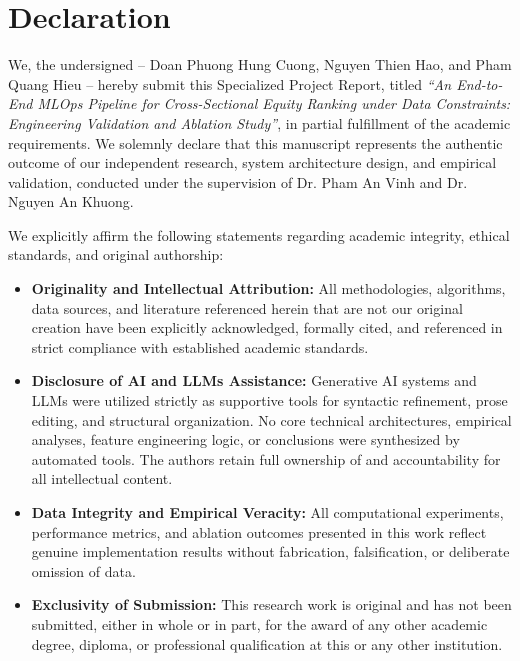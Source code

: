 \part*{Declaration}
We, the undersigned -- Doan Phuong Hung Cuong, Nguyen Thien Hao, and Pham Quang Hieu -- hereby submit this Specialized Project Report, titled \textit{``An End-to-End \acs{MLOps} Pipeline for Cross-Sectional Equity Ranking under Data Constraints: Engineering Validation and Ablation Study''}, in partial fulfillment of the academic requirements. We solemnly declare that this manuscript represents the authentic outcome of our independent research, system architecture design, and empirical validation, conducted under the supervision of {\color{red}Dr. Pham An Vinh} and {\color{red}Dr. Nguyen An Khuong}.

\medskip

We explicitly affirm the following statements regarding academic integrity, ethical standards, and original authorship:
\begin{itemize}
    \item \textbf{Originality and Intellectual Attribution:} All methodologies, algorithms, data sources, and literature referenced herein that are not our original creation have been explicitly acknowledged, formally cited, and referenced in strict compliance with established academic standards.
    \item \textbf{Disclosure of \acs{AI} and \acs{LLMs} Assistance:} Generative \ac{AI} systems and \ac{LLMs} were utilized strictly as supportive tools for syntactic refinement, prose editing, and structural organization. No core technical architectures, empirical analyses, feature engineering logic, or conclusions were synthesized by automated tools. The authors retain full ownership of and accountability for all intellectual content.
    \item \textbf{Data Integrity and Empirical Veracity:} All computational experiments, performance metrics, and ablation outcomes presented in this work reflect genuine implementation results without fabrication, falsification, or deliberate omission of data.
    \item \textbf{Exclusivity of Submission:} This research work is original and has not been submitted, either in whole or in part, for the award of any other academic degree, diploma, or professional qualification at this or any other institution.
\end{itemize}
\clearpage

